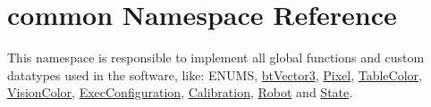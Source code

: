 \hypertarget{namespacecommon}{}\section{common Namespace Reference}
\label{namespacecommon}


This namespace is responsible to implement all global functions and custom datatypes used in the software, like\+: E\+N\+U\+MS, \hyperlink{structcommon_1_1btVector3}{bt\+Vector3}, \hyperlink{structcommon_1_1Pixel}{Pixel}, \hyperlink{structcommon_1_1TableColor}{Table\+Color}, \hyperlink{structcommon_1_1VisionColor}{Vision\+Color}, \hyperlink{structcommon_1_1ExecConfiguration}{Exec\+Configuration}, \hyperlink{structcommon_1_1Calibration}{Calibration}, \hyperlink{structcommon_1_1Robot}{Robot} and \hyperlink{structcommon_1_1State}{State}.  


